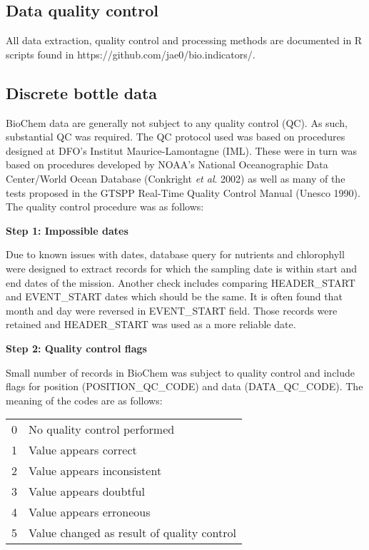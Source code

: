 \documentclass[letterpaper,portrait,11pt]{scrartcl}
\numberwithin{equation}{section}		%
\numberwithin{figure}{section}		%
\numberwithin{table}{section}				%
\begin{document}
\begin{appendices}
  
\section{Data quality control}

All data extraction, quality control and processing methods are documented in R scripts found in https://github.com/jae0/bio.indicators/.

\subsection{Discrete bottle data}

BioChem data are generally not subject to any quality control (QC). As such, substantial QC was required. The QC protocol used was based on procedures designed at DFO's Institut Maurice-Lamontagne (IML). These were in turn was based on procedures developed by NOAA's National Oceanographic Data Center/World Ocean Database (Conkright \textit{et al}. 2002) as well as many of the tests proposed in the GTSPP Real-Time Quality Control Manual (Unesco 1990). The quality control procedure was as follows:

\textbf{Step 1: Impossible dates}

Due to known issues with dates, database query for nutrients and chlorophyll were designed to extract records for which the sampling date is within start and end dates of the mission. Another check includes comparing HEADER\_START and EVENT\_START dates which should be the same. It is often found that month and day were reversed in EVENT\_START field. Those records were retained and HEADER\_START was used as a more reliable date.

\textbf{Step 2: Quality control flags}

Small number of records in BioChem was subject to quality control and  include flags for position (POSITION\_QC\_CODE) and data (DATA\_QC\_CODE). The meaning of the codes are as follows:

\begin{table} [h]
\begin{tabular}{ll}
0 & No quality control performed \\
1 & Value appears correct \\
2 & Value appears inconsistent \\
3 & Value appears doubtful \\
4 & Value  appears erroneous \\
5 & Value changed as result of quality control \\
\end{tabular}
\end{table}


\end{appendices}
\end{document}

